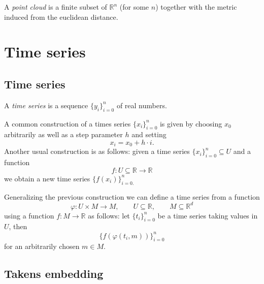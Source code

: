 \documentclass{amsart}
\begin{document}
	A \textit{point cloud} is a finite subset of $\mathbb{R}^n$ (for some $n$) together with the metric induced from the
	euclidean distance.
	
	\section{Time series}
	
	\subsection*{Time series} \label{time_series}
	
	A \textit{time series} is a sequence $\{y_i\}_{i = 0}^n$ of real numbers. 
	
	A common construction of a times series $\{x_i\}_{i = 0}^n$ is given by choosing $x_0$ arbitrarily as well as a step parameter $h$ and setting
	\begin{equation*}
	x_i = x_0 + h\cdot i.
	\end{equation*}
	Another usual construction is as follows: given a time series $\{x_i\}_{i = 0}^n \subseteq U$ and a function
	\begin{equation*}
	f : U \subseteq \mathbb R \to \mathbb R
	\end{equation*}
	we obtain a new time series $\{f(x_i)\}_{i = 0.}^n$
	
	Generalizing the previous construction we can define a time series from a function 
	\begin{equation*}
	\varphi : U \times M \to M, \qquad U \subseteq \mathbb R, \qquad M \subseteq \mathbb R^d
	\end{equation*} 
	using a function $f : M \to \mathbb R$ as follows: let $\{t_i\}_{i=0}^n$ be a time series taking values in $U$, then
	\begin{equation*}
	\{f(\varphi(t_i, m))\}_{i=0}^n
	\end{equation*}
	for an arbitrarily chosen $m \in M$.
	
	\subsection*{Takens embedding}	\label{takens_embedding}
	
\end{document}
